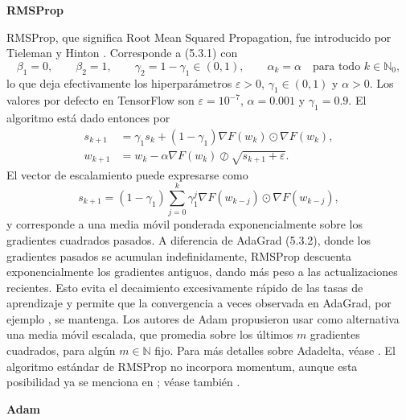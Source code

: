 \documentclass[11pt]{report}
\theoremstyle{definition}
\theoremstyle{plain}
\numberwithin{equation}{section}
\begin{document}
\textbf{RMSProp}

RMSProp, que significa Root Mean Squared Propagation, fue introducido por Tieleman y Hinton \cite{tieleman-hinton-2012}. Corresponde a (5.3.1) con
\begin{equation*}
    \beta_1=0,
    \qquad
    \beta_2=1,
    \qquad
    \gamma_2=1-\gamma_1\in(0,1),
    \qquad
    \alpha_k=\alpha
    \quad
    \text{para todo } k\in\mathbb{N}_0,
\end{equation*}
lo que deja efectivamente los hiperparámetros \(\varepsilon>0\), \(\gamma_1\in(0,1)\) y \(\alpha>0\). Los valores por defecto en TensorFlow \cite{kushner-yin-2003} son \(\varepsilon=10^{-7}\), \(\alpha=0.001\) y \(\gamma_1=0.9\). El algoritmo está dado entonces por
\begin{align*}
    s_{k+1}
    &=
    \gamma_1s_k+(1-\gamma_1)\nabla F(w_k)\odot\nabla F(w_k),
    \tag{5.3.3a}\\
    w_{k+1}
    &=
    w_k-\alpha\nabla F(w_k)\oslash\sqrt{s_{k+1}+\varepsilon}.
    \tag{5.3.3b}
\end{align*}
El vector de escalamiento puede expresarse como
\begin{equation*}
    s_{k+1}
    =
    (1-\gamma_1)
    \sum_{j=0}^{k}
    \gamma_1^j
    \nabla F(w_{k-j})\odot\nabla F(w_{k-j}),
\end{equation*}
y corresponde a una media móvil ponderada exponencialmente sobre los gradientes cuadrados pasados. A diferencia de AdaGrad (5.3.2), donde los gradientes pasados se acumulan indefinidamente, RMSProp descuenta exponencialmente los gradientes antiguos, dando más peso a las actualizaciones recientes. Esto evita el decaimiento excesivamente rápido de las tasas de aprendizaje y permite que la convergencia a veces observada en AdaGrad, por ejemplo \cite{mcmahan-streeter-2010,goodfellow-bengio-courville-2016}, se mantenga. Los autores de Adam \cite{kingma-ba-2015} propusieron usar como alternativa una media móvil escalada, que promedia sobre los últimos \(m\) gradientes cuadrados, para algún \(m\in\mathbb{N}\) fijo. Para más detalles sobre Adadelta, véase \cite{kingma-ba-2015,aggarwal-2018}. El algoritmo estándar de RMSProp no incorpora momentum, aunque esta posibilidad ya se menciona en \cite{tieleman-hinton-2012}; véase también \cite{graves-2013}.

\textbf{Adam}
\end{document}
